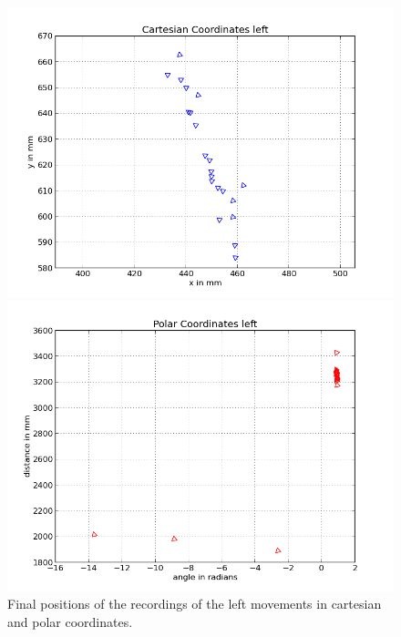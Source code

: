 \documentclass{scrartcl}
\begin{document}
\begin{figure}[H]
\centering
\begin{minipage}{.5\textwidth}
  \centering
  \includegraphics[width=.8\linewidth]{img/left_f.png}
\end{minipage}%
\begin{minipage}{.5\textwidth}
  \centering
  \includegraphics[width=.8\linewidth]{img/left_pc_f.png}
\end{minipage}
\caption{Final positions of the recordings of the left movements in cartesian and polar coordinates.}
\label{fig:left_f}
\end{figure}
\end{document}
